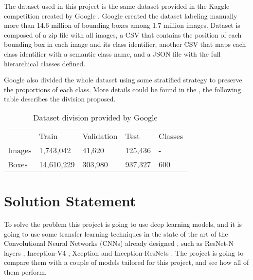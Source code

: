 \documentclass[11pt]{article}
\begin{document}
The dataset used in this project is the same dataset provided in the Kaggle competition created by Google \cite{kaggle}. Google created the dataset labeling manually more than 14.6 million of bounding boxes among 1.7 million images. Dataset is composed of a zip file with all images, a CSV that contains the position of each bounding box in each image and its class identifier, another CSV that maps each class identifier with a semantic class name, and a JSON file with the full hierarchical classes defined.

Google also divided the whole dataset using some stratified strategy to preserve the proportions of each class. More details could be found in the \cite{imgdataset}, the following table describes the division proposed.

\begin{table}[ht]
	\centering
	\caption{ Dataset division provided by Google }
	\label{table1}
	\begin{tabular}{@{}p{3cm}p{2cm}p{2cm}p{2cm}p{1.5cm}@{}}
		\rowcolor[HTML]{EFEFEF}
		& \multicolumn{1}{l}{\cellcolor[HTML]{EFEFEF}Train} & \multicolumn{1}{l}{\cellcolor[HTML]{EFEFEF}Validation} & \multicolumn{1}{l}{\cellcolor[HTML]{EFEFEF}Test} & \multicolumn{1}{l}{\cellcolor[HTML]{EFEFEF}Classes} \\
		Images & 1,743,042                                         & 41,620                                                 & 125,436                                          & -                                                      \\
		Boxes  & 14,610,229                                        & 303,980                                                & 937,327                                          & 600                                                    \\
	\end{tabular}
\end{table}



\section{Solution Statement}

To solve the problem this project is going to use deep learning models, and it is going to use some transfer learning techniques in the state of the art of the Convolutional Neural Networks (CNNs) already designed \cite{cnns}, such as ResNet-N layers \cite{resnet}, Inception-V4 \cite{inception}, Xception \cite{xception} and Inception-ResNets \cite{inception}. The project is going to compare them with a couple of models tailored for this project, and see how all of them perform.
\end{document}
